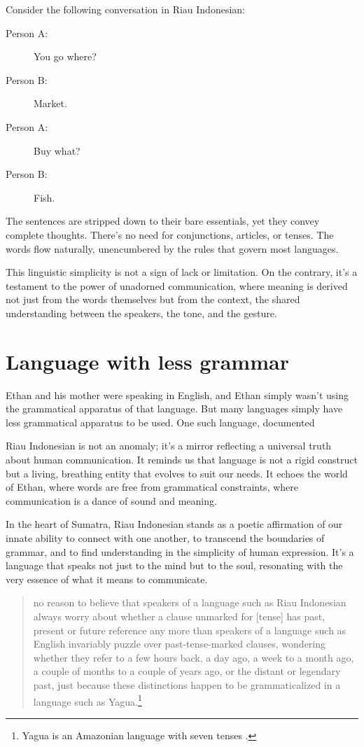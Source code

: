 Consider the following conversation in Riau Indonesian:

\begin{description}
    \item[Person A:] You go where?
    \item[Person B:] Market.
    \item[Person A:] Buy what?
    \item[Person B:] Fish.
\end{description}

The sentences are stripped down to their bare essentials, yet they convey complete thoughts. There's no need for conjunctions, articles, or tenses. The words flow naturally, unencumbered by the rules that govern most languages.

This linguistic simplicity is not a sign of lack or limitation. On the contrary, it's a testament to the power of unadorned communication, where meaning is derived not just from the words themselves but from the context, the shared understanding between the speakers, the tone, and the gesture.

\section{Language with less grammar}

Ethan and his mother were speaking in English, and Ethan simply wasn't using the grammatical apparatus of that language. But many languages simply have less grammatical apparatus to be used. One such language, documented 

Riau Indonesian is not an anomaly; it's a mirror reflecting a universal truth about human communication. It reminds us that language is not a rigid construct but a living, breathing entity that evolves to suit our needs. It echoes the world of Ethan, where words are free from grammatical constraints, where communication is a dance of sound and meaning.

In the heart of Sumatra, Riau Indonesian stands as a poetic affirmation of our innate ability to connect with one another, to transcend the boundaries of grammar, and to find understanding in the simplicity of human expression. It's a language that speaks not just to the mind but to the soul, resonating with the very essence of what it means to communicate.

\begin{quotation}
    no reason to believe that speakers of a language such as Riau Indonesian always worry about whether a clause unmarked for [tense] has past, present or future reference any more than speakers of a language such as English invariably puzzle over past-tense-marked clauses, wondering whether they refer to a few hours back, a day ago, a week to a month ago, a couple of months to a couple of years ago, or the distant or legendary past, just because these distinctions happen to be grammaticalized in a language such as Yagua.\footnote{Yagua is an Amazonian language with seven tenses \autocite[385]{Payne1990}.} \hfill\autocite[43--44]{Gil2014}
\end{quotation}

